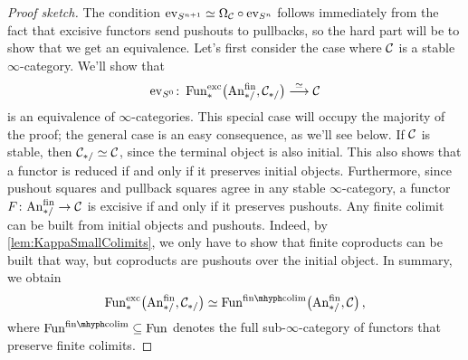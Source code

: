 \begin{proof}[Proof sketch]
	The condition $\operatorname{ev}_{S^{n+1}}\simeq \Omega_{\mathcal{C}}\circ \operatorname{ev}_{S^n}$ follows immediately from the fact that excisive functors send pushouts to pullbacks, so the hard part will be to show that we get an equivalence. Let's first consider the case where $\mathcal{C}$ is a stable $\infty$-category. We'll show that
	\begin{equation*}
		\ev_{S^0}\colon \Fun_*^\mathrm{exc}\bigl(\FinAn,\Cc_{*/}\bigr)\overset{\simeq}{\longrightarrow} \Cc
	\end{equation*}
	is an equivalence of $\infty$-categories. This special case will occupy the majority of the proof; the general case is an easy consequence, as we'll see below. If $\mathcal{C}$ is stable, then $\mathcal{C}_{*/}\simeq \mathcal{C}$, since the terminal object is also initial. This also shows that a functor is reduced if and only if it preserves initial objects. Furthermore, since pushout squares and pullback squares agree in any stable $\infty$-category, a functor $F\colon \FinAn\rightarrow \Cc$ is excisive if and only if it preserves pushouts. Any finite colimit can be built from initial objects and pushouts. Indeed, by \cref{lem:KappaSmallColimits}, we only have to show that finite coproducts can be built that way, but coproducts are pushouts over the initial object. In summary, we obtain
	\begin{equation*}
		\Fun_*^\mathrm{exc}\bigl(\FinAn,\Cc_{*/}\bigr)\simeq \Fun^{\mathrm{fin}\mhyph\mathrm{colim}}\bigl(\FinAn,\Cc\bigr)\,,
	\end{equation*}
	where $\Fun^{\mathrm{fin}\mhyph\mathrm{colim}}\subseteq \Fun$ denotes the full sub-$\infty$-category of functors that preserve finite colimits.
	

\end{proof}

